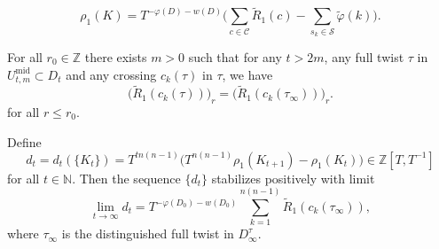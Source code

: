\documentclass[10pt,a4paper]{amsart}
\newcommand{\N}{\mathbb{N}}
\newcommand{\Z}{\mathbb{Z}}
\begin{document}
	\begin{equation}
		\label{eq:new_rho}
		\rho_1(K) = T^{-\varphi(D) - w(D)} \Big( \sum_{c \in \mathcal{C}} \tilde{R}_1(c) - \sum_{s_k \in \mathcal{S}} \tilde{\varphi}(k) \Big).
	\end{equation}

	\begin{lemma}
		\label{lem:tech}
		For all $r_0 \in \Z$ there exists $m > 0$ such that for any $t > 2m$, any full twist $\tau$ in $U_{t,m}^\text{mid} \subset D_t$ and any crossing $c_k(\tau)$ in $\tau$, we have
		$$
		\big(\widetilde{R}_1(c_k(\tau))\big)_r = \big(\widetilde{R}_1(c_k(\tau_\infty))\big)_r.
		$$
		for all $r \leq r_0$.
	\end{lemma}

	\begin{thm}
		\label{prop:main}
		Define
		$$
		d_t = d_t(\{K_t\}) = T^{tn(n - 1)} \Big( T^{n(n - 1)}\rho_1(K_{t + 1}) - \rho_1(K_t) \Big) \in \Z[T,T^{-1}]
		$$
		for all $t \in \N$. Then the sequence $\{d_t\}$ stabilizes positively with limit
		$$
		\lim_{t \to \infty} d_t = T^{-\varphi(D_0) -w(D_0)} \sum_{k = 1}^{n(n - 1)} \widetilde{R}_1(c_k(\tau_\infty)),
		$$
		where $\tau_\infty$ is the distinguished full twist in $D^\tau_\infty$.
	\end{thm}
\end{document}
